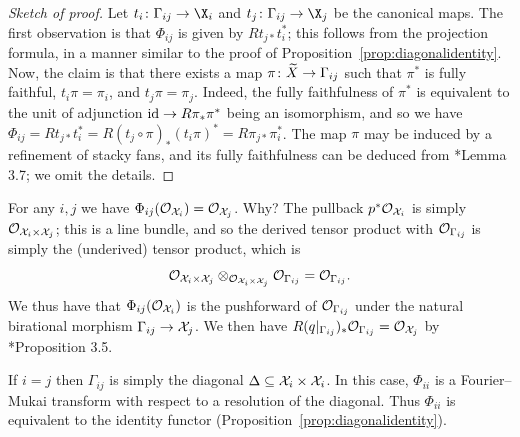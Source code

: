 \documentclass{amsart}
\begin{document}
\begin{proof}[Sketch of proof]
Let $t_i \co \Gamma_{ij} \to \X_i$ and $t_j \co \Gamma_{ij} \to \X_j$ be the canonical maps. The first observation is that $\Phi_{ij}$ is given by $Rt_{j*} t_i^*$; this follows from the projection formula, in a manner similar to the proof of Proposition~\ref{prop:diagonalidentity}. Now, the claim is that there exists a map $\pi \colon \widetilde{X} \to \Gamma_{ij}$ such that $\pi^*$ is fully faithful, $t_i\pi = \pi_i$, and $t_j \pi = \pi_j$. Indeed, the fully faithfulness of $\pi^*$ is equivalent to the unit of adjunction $\operatorname{id} \to R\pi_*\pi^*$ being an isomorphism, and so we have $\Phi_{ij} = Rt_{j*} t_i^* = R(t_{j} \circ \pi)_*(t_i\pi)^* = R\pi_{j*} \pi_i^*$. The map $\pi$ may be induced by a refinement of stacky fans, and its fully faithfulness can be deduced from \cite{BBB+24}*{Lemma 3.7}; we omit the details. 
\end{proof}

\begin{example}
    For any $i,j$ we have $\Phi_{ij}({\mathcal O}_{\mathcal X_i})={\mathcal O}_{\mathcal X_j}$.  Why?  The pullback $p^*{\mathcal O}_{\mathcal X_i}$ is simply ${\mathcal O}_{\mathcal X_i\times \mathcal X_j}$; this is a line bundle, and so the derived tensor product with ${\mathcal O}_{\Gamma_{ij}}$ is simply the (underived) tensor product, which is
    \[
    {\mathcal O}_{\mathcal X_i\times\mathcal X_j} \otimes_{{\mathcal O}_{\mathcal X_i\times \mathcal X_j}}{\mathcal O}_{\Gamma_{ij}} = {\mathcal O}_{\Gamma_{ij}}.
    \]
We thus have that $\Phi_{ij}({\mathcal O}_{\mathcal X_i})$ is the pushforward of ${\mathcal O}_{\Gamma_{ij}}$ under the natural birational morphism $\Gamma_{ij}\to \mathcal X_j$.  We then have $R(q|_{\Gamma_{ij}})_* {\mathcal O}_{\Gamma_{ij}} = {\mathcal O}_{\mathcal X_j}$ by \cite{BBB+24}*{Proposition 3.5}.
\end{example}

\begin{example}
    If $i=j$ then $\Gamma_{ij}$ is simply the diagonal $\Delta\subseteq \mathcal X_i\times \mathcal X_i$.  In this case,  $\Phi_{ii}$ is a Fourier--Mukai transform with respect to a resolution of the diagonal.  Thus $\Phi_{ii}$ is equivalent to the identity functor (Proposition~\ref{prop:diagonalidentity}).
\end{example}
\end{document}
